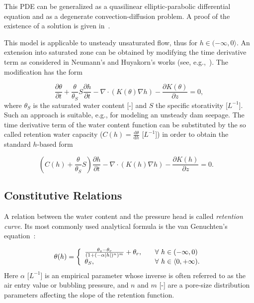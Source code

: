 \documentclass[final,3p,times,twocolumn]{elsarticle}
\begin{document}
This PDE can be generalized as a quasilinear elliptic-parabolic differential equation and as 
a degenerate convection-diffusion problem. A proof of the existence of a   solution  is given in~\cite{alt-luckhaus}. 

This model is applicable to unsteady unsaturated flow, thus for $h \in (-\infty , 0 \rangle$. 
An extension into saturated zone can be obtained by modifying the time derivative term 
as considered in Neumann's and Huyakorn's works (see, e.g.,~\cite{neuman1,neuman2,neuman3,huyakorn1,huyakorn2}). The modification has the form 

\begin{equation}
\label{neuman-mod}
\frac{\partial \theta}{\partial t} + \frac{\theta}{\theta_S} S \frac{\partial h}{\partial t}
- \nabla \cdot \left( K(\theta) \nabla h \right) - \frac{\partial K(\theta)}{\partial z} = 0,
\end{equation}
where $\theta_S$ is the saturated water content [-] and $S$ the specific storativity 
[$L^{-1}$]. Such an approach is suitable, e.g., for modeling an unsteady dam seepage.
The time derivative term of the water content function can be substituted by 
the so called retention water capacity ($C(h) = \frac{\textrm{d}\theta}{\textrm{d} h}$ [$L^{-1}$])
in order to obtain the standard $h$-based form

\begin{equation}\label{rich-final}
\left(C(h)
+ \frac{\theta}{\theta_S} S \right) \frac{\partial h}{\partial t}
- \nabla \cdot \left( K(h) \nabla h \right) - \frac{\partial K(h)}{\partial z} = 0.\ \ \ \ 
\end{equation}

\subsection{Constitutive Relations}

A relation between the water content and the pressure head is called 
{\em retention curve}. Its most commonly used analytical formula is 
the van Genuchten's equation~\cite{vangenuchten}:

\begin{equation}
\label{vangenuchten-eq}
\theta (h) = \left\{ 
\begin{array}{l l}
 \frac{\theta_s -\theta_r}{(1+(-\alpha |h|)^n)^m} + \theta_r,  & \quad \mbox{$\forall$ $h \in (-\infty, 0 )$}\\
  \theta_S, & \quad \mbox{$\forall$ $h \in \langle 0, + \infty )$}.\\
\end{array} \right.
\end{equation}
Here $\alpha$ [$L^{-1}$] is an empirical parameter  whose inverse is often 
referred to as the air entry value or bubbling pressure, and $n$ and $m$ [-]  
are a pore-size distribution parameters affecting the slope of the retention 
function.
\end{document}
